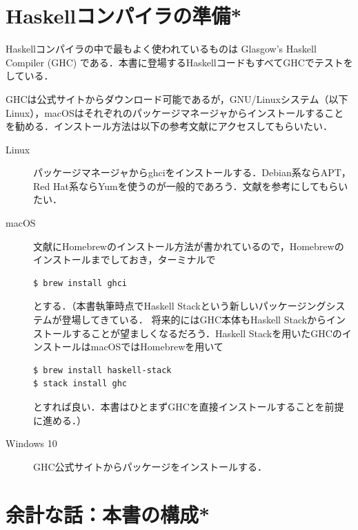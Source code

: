 \documentclass[a4paper]{jsbook}
\newcommand{\programminglanguage}[1]{\textsf{#1}}
\newcommand{\haskell}{\programminglanguage{Haskell}}
\newcommand{\keyword}[1]{{\underline{\emph{#1}}}}
\begin{document}



\section{\haskell コンパイラの準備*}

\haskell コンパイラの中で最もよく使われているものは Glasgow's Haskell Compiler (GHC) である．本書に登場する\haskell コードもすべてGHCでテストをしている．

GHCは公式サイト\cite{haskellplatform}からダウンロード可能であるが，GNU/Linuxシステム（以下Linux），macOSはそれぞれのパッケージマネージャからインストールすることを勧める．インストール方法は以下の参考文献にアクセスしてもらいたい．
\begin{description}
\item[Linux] パッケージマネージャからghciをインストールする．Debian系ならAPT，Red Hat系ならYumを使うのが一般的であろう．文献\cite{linux}を参考にしてもらいたい．
\item[macOS] 文献\cite{osx}にHomebrewのインストール方法が書かれているので，Homebrewのインストールまでしておき，ターミナルで
\begin{verbatim}
$ brew install ghci
\end{verbatim} %
とする．（本書執筆時点でHaskell Stackという新しいパッケージングシステムが登場してきている．
将来的にはGHC本体もHaskell Stackからインストールすることが望ましくなるだろう．Haskell Stackを用いたGHCのインストールはmacOSではHomebrewを用いて
\begin{verbatim}
$ brew install haskell-stack
$ stack install ghc
\end{verbatim} %
とすれば良い．本書はひとまずGHCを直接インストールすることを前提に進める．）
\item[Windows 10] GHC公式サイト\cite{haskellplatform}からパッケージをインストールする．
\end{description}

\section{余計な話：本書の構成*}
\end{document}

